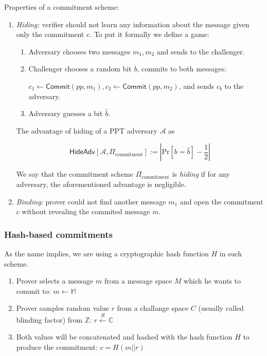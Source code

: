 \documentclass[../lecture-notes.tex]{subfiles}
\begin{document}
\begin{definition}
    Properties of a commitment scheme:
    \begin{enumerate}
        \item \textit{Hiding: } verifier should not learn any information about the message given only the commitment c. To put it formally we define a game:
        \begin{enumerate}
            \item Adversary chooses two messages $m_1,m_2$ and sends to the challenger.
            \item Challenger chooses a random bit $b$, commits to both messages: 
            
                $c_1 \gets \mathsf{Commit}(pp, m_1), c_2 \gets \mathsf{Commit}(pp,m_2)$, and sends $c_b$ to the adversary.
            \item Adversary guesses a bit $\hat{b}$.
        \end{enumerate}
        
        The advantage of hiding of a PPT adversary $\mathcal{A}$ as 
        
        $$
        \mathsf{HideAdv}[\mathcal{A}, \Pi_{\text{commitment}}] := \left| \text{Pr}[b=\hat{b}] - \frac{1}{2} \right|
        $$
        
        We say that the commitment scheme $\Pi_{\text{commitment}}$ is \textit{hiding} if for any adversary, the aforementioned advantage is negligible.
        
        \item \textit{Binding: } prover could not find another message $m_1$ and open the commitment $c$ without revealing the commited message $m$.

    \end{enumerate}
\end{definition}

\subsubsection{Hash-based commitments}

As the name implies, we are using a cryptographic hash function \(H\) in such scheme.

\begin{enumerate}
    \item Prover selects a message $m$ from a message space $M$ which he wants to commit to:
        $m \leftarrow \mathbb{M}$

    \item Prover samples random value $r$ from a challange space $C$ (usually called blinding factor) from $\mathbb{Z}$:
        $r \xleftarrow{R} \mathbb{C}$
    
    \item Both values will be concatenated and hashed with the hash function $H$ to produce the commitment:
        $c = H(m || r)$

\end{enumerate}
\end{document}
